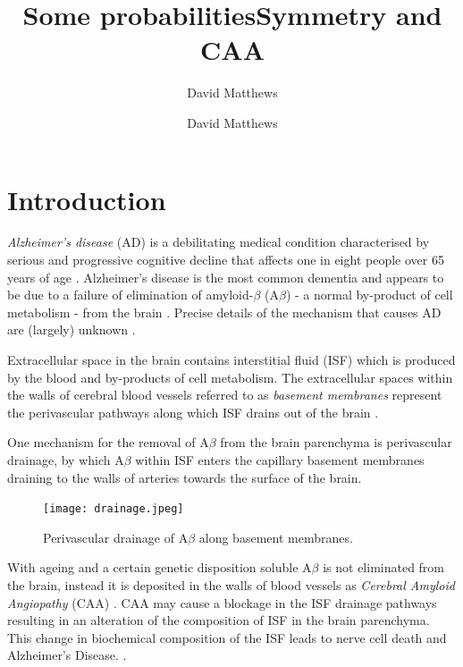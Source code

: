 \documentclass[12pt]{article} %
\title{Some probabilities}
\author{David Matthews}
\theoremstyle{definition}
\begin{document}
\title{Symmetry and CAA}
\author{David Matthews}

\section{Introduction}\label{sec:intro}
\emph{Alzheimer's disease} (AD) is a debilitating medical condition characterised by serious and progressive cognitive decline that affects one in eight people over 65 years of age \cite{Bengt}. Alzheimer's disease is the most common dementia and appears to be due to a failure of elimination of amyloid-$\beta$ (A$\beta$) - a normal by-product of cell metabolism %
- from the brain \cite{wellermicro}. Precise details of the mechanism that causes AD are (largely) unknown  \cite{wellerperi}.  %

Extracellular space in the brain contains interstitial fluid (ISF) which is produced by the blood and by-products of cell metabolism.  The extracellular spaces within the walls of cerebral blood vessels referred to as \emph{basement membranes} represent the perivascular pathways along which ISF drains out of the brain \cite{wellerperi,wellermicro,Rox}.  

One mechanism for the removal of A$\beta$ from the brain parenchyma is perivascular drainage, by which A$\beta$ within ISF enters the capillary basement membranes draining to the walls of arteries towards the surface of the brain. 

\begin{figure}[h]

              \centering
               \texttt{[image: drainage.jpeg]}
                \caption{Perivascular drainage of A$\beta$ along basement membranes.}\label{fig:1}
\end{figure}

With ageing and a certain genetic disposition soluble A$\beta$ is not eliminated from the brain, instead it is deposited in the walls of blood vessels as \emph{Cerebral Amyloid Angiopathy} (CAA) \cite{Rox,;wellerperi}. CAA may cause a blockage in the ISF drainage pathways resulting in an alteration of the composition of ISF in the brain parenchyma. This change in biochemical composition of the ISF leads to nerve cell death and Alzheimer's Disease. \cite{Rox}.   
\end{document}
